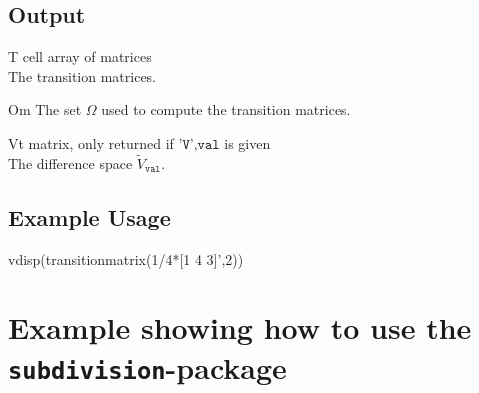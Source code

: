 \subsection*{Output}
\begin{param}
\item[T] cell array of matrices\\The transition matrices.
\item[Om] The set $\Omega$ used to compute the transition matrices.
\item[Vt] matrix, only returned if $\texttt{'V',val}$ is given\\
The difference space $\tilde{V}_\texttt{val}$.
\end{param}

\subsection*{Example Usage}
\begin{param}
\item[{vdisp(transitionmatrix({1/4*[1 4 3]',2}))}]
\end{param}

\section{Example showing how to use the \texttt{subdivision}-package}

